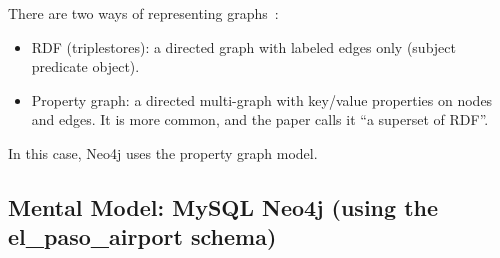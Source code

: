 \documentclass[10pt,a4paper,twocolumn]{article}
\begin{document}
There are two ways of representing graphs~\cite{stonebraker2024whatgoesaround}:

\begin{itemize}
  \item RDF (triplestores): a directed graph with labeled edges only (subject \textrightarrow{} predicate \textrightarrow{} object).
  \item Property graph: a directed multi-graph with key/value properties on nodes and edges. It is more common, and the paper calls it ``a superset of RDF''.
\end{itemize}

In this case, Neo4j uses the property graph model.

\subsection{Mental Model: MySQL \textrightarrow{} Neo4j (using the el\_paso\_airport schema)}
\end{document}
